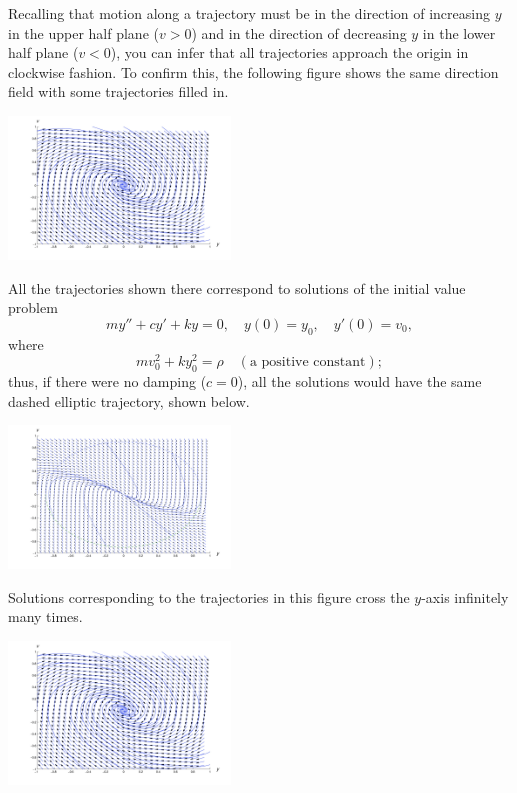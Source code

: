 \documentclass{ximera}
\begin{document}
Recalling that
motion along a trajectory must be in the direction of increasing $y$
in the upper half plane ($v>0$) and in the direction of decreasing $y$
in the lower half plane ($v<0$), you can infer that all trajectories
approach the origin in clockwise fashion. To confirm this, the following figure shows the same direction field with some
trajectories filled in. 

\begin{image}
 \includegraphics[height=1.5in]{fig040412.jpg} 
\end{image}


All the trajectories shown there correspond to
solutions of the initial value problem
$$
my''+cy'+ky=0,\quad y(0)=y_0,\quad y'(0)=v_0,
$$
where
$$
mv_0^2+ky_0^2=\rho\quad (\mbox{a positive constant});
$$
thus, if there were no damping ($c=0$),  all the solutions would
have the same dashed elliptic trajectory, shown below.

\begin{image}
 \includegraphics[height=1.5in]{fig040414.jpg} 
\end{image}

Solutions corresponding to the trajectories in
this figure cross the $y$-axis infinitely many times.

\begin{image}
 \includegraphics[height=1.5in]{fig040412.jpg} 
\end{image}
\end{document}
